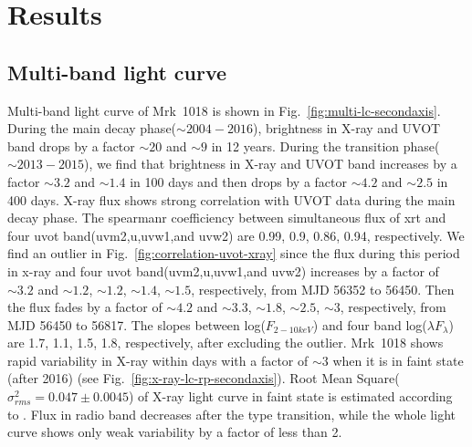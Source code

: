 \documentclass[twocolumn]{aastex63}
\begin{document}
\section{Results}
\label{sec:result}

\subsection{Multi-band light curve}
Multi-band light curve of Mrk~1018 is shown in Fig.~\ref{fig:multi-lc-secondaxis}. During the main decay phase($\sim 2004-2016$), brightness in X-ray and UVOT band drops by a factor $\sim20$ and $\sim9$ in 12 years. During the transition phase($\sim 2013-2015$), we find that brightness in X-ray and UVOT band increases by a factor $\sim3.2$ and $\sim1.4$ in 100 days and then drops by a factor $\sim4.2$ and $\sim2.5$ in 400 days. X-ray flux shows strong correlation with UVOT data during the main decay phase. The spearmanr coefficiency between simultaneous flux of xrt and four uvot band(uvm2,u,uvw1,and uvw2) are 0.99, 0.9, 0.86, 0.94, respectively. We find an outlier in Fig.~\ref{fig:correlation-uvot-xray} since the flux during this period in x-ray and four uvot band(uvm2,u,uvw1,and uvw2) increases by a factor of $\sim 3.2$ and $\sim 1.2$, $\sim 1.2$, $\sim 1.4$, $\sim 1.5$, respectively, from MJD 56352 to 56450. Then the flux fades by a factor of $\sim 4.2$ and $\sim 3.3$, $\sim 1.8$, $\sim 2.5$, $\sim 3$, respectively, from MJD 56450 to 56817. The slopes between log($F_{2-10keV}$) and four band log($\lambda F_{\lambda}$) are 1.7, 1.1, 1.5, 1.8, respectively, after excluding the outlier. Mrk~1018 shows rapid variability in X-ray within days with a factor of $\sim3$ when it is in faint state (after 2016) (see Fig.~\ref{fig:x-ray-lc-rp-secondaxis}). Root Mean Square($\sigma^2_{rms} = 0.047 \pm 0.0045 $) of X-ray light curve in faint state is estimated according to \citet{1999ApJ...524..667T}. Flux in radio band decreases after the type transition, while the whole light curve shows only weak variability by a factor of less than 2.

\end{document}
